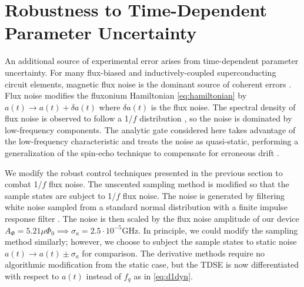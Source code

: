 \section{Robustness to Time-Dependent Parameter Uncertainty \label{sec:stochastic}}
An additional source of experimental error arises from time-dependent
parameter uncertainty. For many flux-biased and inductively-coupled
superconducting circuit elements, magnetic flux noise is the dominant
source of coherent errors \cite{bialczak20071f, kakuyanagi2007dephasing,
  kumar2016origin, yoshihara2006decoherence}. Flux noise
modifies the fluxonium Hamiltonian \eqref{eq:hamiltonian}
by $a(t) \rightarrow a(t) + \delta a(t)$ where $\delta a(t)$ is the flux noise.
The spectral density of flux noise is observed to
follow a 1/$f$ distribution
\cite{bialczak20071f, koch2007model, kakuyanagi2007dephasing,
  kumar2016origin, yoshihara2006decoherence, yoshihara2010correlated,
  zhang2020universal},
so the noise is dominated by low-frequency components.
The analytic gate considered here
takes advantage of the low-frequency characteristic and
treats the noise as quasi-static, performing a generalization of the spin-echo
technique to compensate for erroneous drift \cite{hahn1952spin, meiboom1958modified}.

We modify the robust control techniques presented
in the previous section to combat 1/$f$ flux noise.
The unscented sampling method is modified so that the sample states
are subject to 1/$f$ flux noise. The noise
is generated by filtering white noise sampled from a standard
normal distribution with a finite impulse response filter \cite{saspweb2011}.
The noise is then scaled by the 
flux noise amplitude of our device $A_{\Phi} = 5.21 \mu \Phi_{0} \implies
\sigma_{a} = 2.5 \cdot 10^{-5} \textrm{GHz}$.
In principle, we could modify the sampling method
similarly; however, we choose to subject the sample states
to static noise
$a(t) \rightarrow a(t) \pm \sigma_{a}$
for comparison. The derivative methods require no algorithmic modification
from the static case, but the TDSE is now differentiated with respect
to $a(t)$ instead of $f_{q}$ as in \eqref{eq:d1dyn}.

